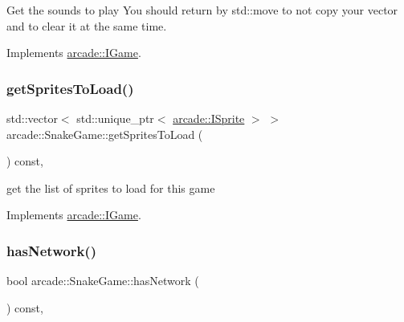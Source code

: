 Get the sounds to play You should return by std\+::move to not copy your vector and to clear it at the same time. 



Implements \hyperlink{classarcade_1_1_i_game_a88b3c7efb13780cdbbdf5b879a18ed4d}{arcade\+::\+I\+Game}.

\mbox{\label{classarcade_1_1_snake_game_aac167f01d2da5121b2f34dd3ca258a45}} 
\subsubsection{\texorpdfstring{get\+Sprites\+To\+Load()}{getSpritesToLoad()}}
{\footnotesize\ttfamily std\+::vector$<$ std\+::unique\+\_\+ptr$<$ \hyperlink{classarcade_1_1_i_sprite}{arcade\+::\+I\+Sprite} $>$ $>$ arcade\+::\+Snake\+Game\+::get\+Sprites\+To\+Load (\begin{DoxyParamCaption}{ }\end{DoxyParamCaption}) const\hspace{0.3cm}{\ttfamily [override]}, {\ttfamily [virtual]}}



get the list of sprites to load for this game 



Implements \hyperlink{classarcade_1_1_i_game_a2d0dc7c78a68c4dd0359911775993f68}{arcade\+::\+I\+Game}.

\mbox{\label{classarcade_1_1_snake_game_aa93dbf6b52cb70629abbf646ed33374f}} 
\subsubsection{\texorpdfstring{has\+Network()}{hasNetwork()}}
{\footnotesize\ttfamily bool arcade\+::\+Snake\+Game\+::has\+Network (\begin{DoxyParamCaption}{ }\end{DoxyParamCaption}) const\hspace{0.3cm}{\ttfamily [override]}, {\ttfamily [virtual]}}



